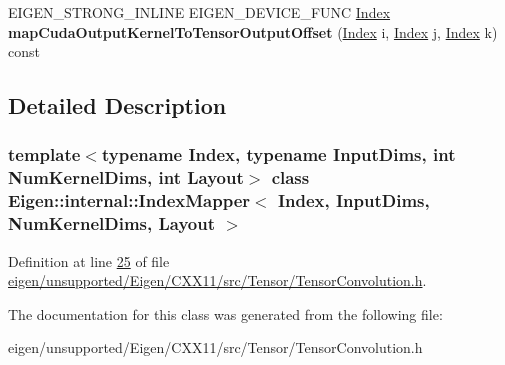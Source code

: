 \begin{DoxyCompactItemize}
\item 
\mbox{\label{class_eigen_1_1internal_1_1_index_mapper_a8121fd0cad53f4325760a1e11997e02d}} 
E\+I\+G\+E\+N\+\_\+\+S\+T\+R\+O\+N\+G\+\_\+\+I\+N\+L\+I\+NE E\+I\+G\+E\+N\+\_\+\+D\+E\+V\+I\+C\+E\+\_\+\+F\+U\+NC \hyperlink{namespace_eigen_a62e77e0933482dafde8fe197d9a2cfde}{Index} {\bfseries map\+Cuda\+Output\+Kernel\+To\+Tensor\+Output\+Offset} (\hyperlink{namespace_eigen_a62e77e0933482dafde8fe197d9a2cfde}{Index} i, \hyperlink{namespace_eigen_a62e77e0933482dafde8fe197d9a2cfde}{Index} j, \hyperlink{namespace_eigen_a62e77e0933482dafde8fe197d9a2cfde}{Index} k) const
\end{DoxyCompactItemize}


\subsection{Detailed Description}
\subsubsection*{template$<$typename Index, typename Input\+Dims, int Num\+Kernel\+Dims, int Layout$>$\newline
class Eigen\+::internal\+::\+Index\+Mapper$<$ Index, Input\+Dims, Num\+Kernel\+Dims, Layout $>$}



Definition at line \hyperlink{eigen_2unsupported_2_eigen_2_c_x_x11_2src_2_tensor_2_tensor_convolution_8h_source_l00025}{25} of file \hyperlink{eigen_2unsupported_2_eigen_2_c_x_x11_2src_2_tensor_2_tensor_convolution_8h_source}{eigen/unsupported/\+Eigen/\+C\+X\+X11/src/\+Tensor/\+Tensor\+Convolution.\+h}.



The documentation for this class was generated from the following file\+:\begin{DoxyCompactItemize}
\item 
eigen/unsupported/\+Eigen/\+C\+X\+X11/src/\+Tensor/\+Tensor\+Convolution.\+h\end{DoxyCompactItemize}
